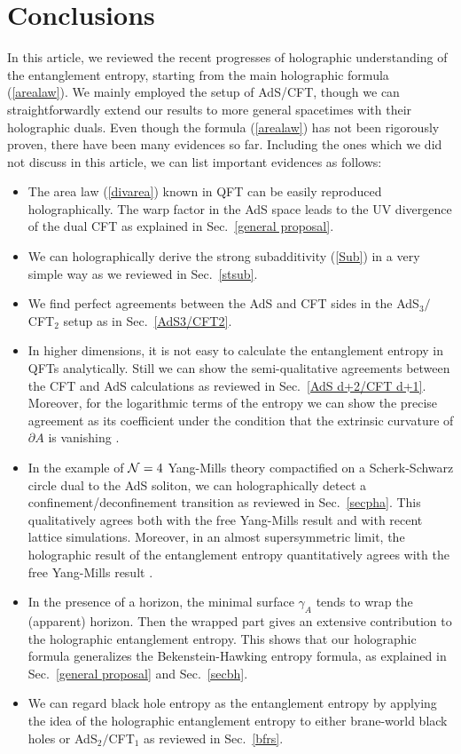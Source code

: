 \documentclass[12pt]{article}
\def\CN{{\cal N}}
\def\de{\partial}
\def\CN{{\cal N}}
\begin{document}
\section{Conclusions}\label{seccon}
\setcounter{equation}{0}
\hspace{5mm}
In this article, we reviewed the recent progresses of holographic understanding of
the entanglement entropy,
starting from the main holographic formula (\ref{arealaw}).
We mainly employed the setup of AdS/CFT, though we can
straightforwardly extend our results to more general spacetimes with their
holographic duals. Even though the formula (\ref{arealaw}) has not been rigorously
proven, there have been many evidences so far. Including the ones which we did not discuss in this
article, we can list important evidences as follows:
\begin{itemize}
  \item The area law (\ref{divarea}) known in QFT can be easily reproduced holographically.
       The warp factor in the AdS space leads to the UV divergence
       of the dual CFT as explained in Sec.\ \ref{general proposal}.
  \item We can holographically derive the strong subadditivity
  (\ref{Sub}) in a very simple way as we reviewed in Sec.\ \ref{stsub}.
  \item We find perfect agreements between the AdS and CFT sides
  in the AdS$_3/$CFT$_2$ setup as in Sec.\ \ref{AdS3/CFT2}.
  \item In higher dimensions, it is not easy to
  calculate the entanglement entropy in QFTs analytically. Still we
  can show the semi-qualitative agreements between the CFT and AdS
  calculations as reviewed in Sec.\ \ref{AdS d+2/CFT d+1}.
  Moreover, for the logarithmic terms of the
  entropy we can show the precise agreement as its coefficient
  under the condition that the extrinsic curvature of $\de A$ is vanishing
  \cite{RuTaL}.
  \item In the example of $\CN =4$ Yang-Mills theory compactified
  on a Scherk-Schwarz circle dual to the AdS soliton, we can holographically detect
  a confinement/deconfinement transition as reviewed in Sec.\ \ref{secpha}.
  This qualitatively agrees both with the free Yang-Mills result
    and with recent lattice simulations. Moreover, in an almost supersymmetric limit,
   the holographic
    result of the entanglement entropy quantitatively agrees with the free Yang-Mills
    result \cite{Nishioka:2006gr}.
  \item
  In the presence of a horizon, the minimal surface $\gamma_A$
  tends to wrap the (apparent) horizon. Then the wrapped part gives
  an extensive contribution to the holographic entanglement entropy.
 This shows that our holographic formula generalizes the Bekenstein-Hawking
 entropy formula, as explained in Sec.\ \ref{general proposal}
  and Sec.\ \ref{secbh}.
  \item
  We can regard black hole entropy as the entanglement entropy
  by applying the idea of the holographic entanglement entropy to
  either brane-world black holes or AdS$_2/$CFT$_1$ as reviewed in
  Sec.\ \ref{bfrs}.


\end{itemize}
\end{document}
